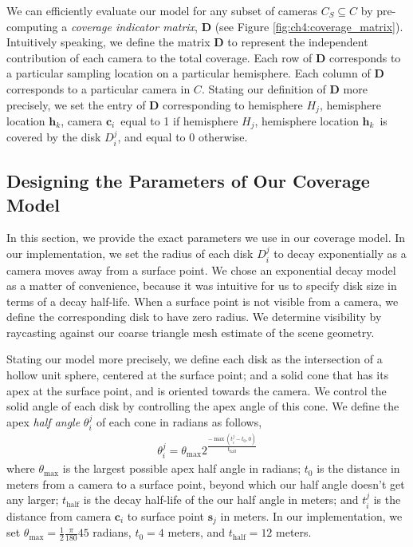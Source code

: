 We can efficiently evaluate our model for any subset of cameras $C_S \subseteq C$ by pre-computing a \emph{coverage indicator matrix}, $\mathbf{D}$ (see Figure \ref{fig:ch4:coverage_matrix}).
Intuitively speaking, we define the matrix $\mathbf{D}$ to represent the independent contribution of each camera to the total coverage.
Each row of $\mathbf{D}$ corresponds to a particular sampling location on a particular hemisphere.
Each column of $\mathbf{D}$ corresponds to a particular camera in $C$.
Stating our definition of $\mathbf{D}$ more precisely, we set the entry of $\mathbf{D}$ corresponding to \textbraceleft hemisphere $H_j$, hemisphere location $\mathbf{h}_k$, camera $\mathbf{c}_i$\textbraceright ~equal to 1 if \textbraceleft hemisphere $H_j$, hemisphere location $\mathbf{h}_k$\textbraceright ~is covered by the disk $D^j_i$, and equal to 0 otherwise.


\subsection{Designing the Parameters of Our Coverage Model}
\label{sec:ch4:parameters}

In this section, we provide the exact parameters we use in our coverage model.
In our implementation, we set the radius of each disk $D^j_i$ to decay exponentially as a camera moves away from a surface point.
We chose an exponential decay model as a matter of convenience, because it was intuitive for us to specify disk size in terms of a decay half-life.
When a surface point is not visible from a camera, we define the corresponding disk to have zero radius.
We determine visibility by raycasting against our coarse triangle mesh estimate of the scene geometry.

Stating our model more precisely, we define each disk as the intersection of a hollow unit sphere, centered at the surface point; and a solid cone that has its apex at the surface point, and is oriented towards the camera.
We control the solid angle of each disk by controlling the apex angle of this cone.
We define the apex \emph{half angle} $\theta^j_i$ of each cone in radians as follows,
%
\begin{equation}
\begin{aligned}
\theta^j_i = \theta_\text{max} 2^{ \frac{ -\max(t^j_i - t_0, 0) }{ t_{\text{half}} } }
\end{aligned}
\end{equation}
%
where
$\theta_{\text{max}}$ is the largest possible apex half angle in radians;
$t_0$ is the distance in meters from a camera to a surface point, beyond which our half angle doesn't get any larger;
$t_{\text{half}}$ is the decay half-life of the our half angle in meters; and
$t^j_i$ is the distance from camera $\mathbf{c}_i$ to surface point $\mathbf{s}_j$ in meters.
In our implementation, we set $\theta_{\text{max}} = \frac{1}{2} \frac{\pi}{180} 45$ radians, $t_0 = 4$ meters, and $t_\text{half} = 12$ meters.

